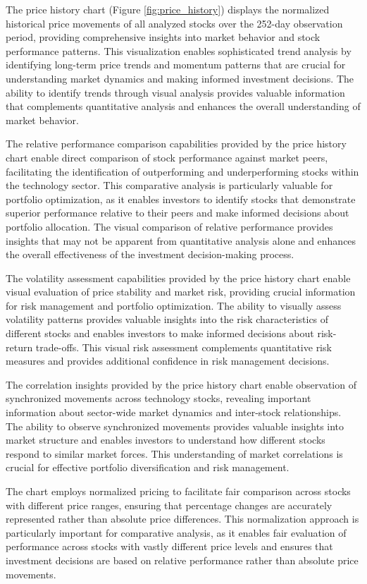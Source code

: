 \documentclass[12pt,a4paper]{article}
\begin{document}
The price history chart (Figure \ref{fig:price_history}) displays the normalized historical price movements of all analyzed stocks over the 252-day observation period, providing comprehensive insights into market behavior and stock performance patterns. This visualization enables sophisticated trend analysis by identifying long-term price trends and momentum patterns that are crucial for understanding market dynamics and making informed investment decisions. The ability to identify trends through visual analysis provides valuable information that complements quantitative analysis and enhances the overall understanding of market behavior.

The relative performance comparison capabilities provided by the price history chart enable direct comparison of stock performance against market peers, facilitating the identification of outperforming and underperforming stocks within the technology sector. This comparative analysis is particularly valuable for portfolio optimization, as it enables investors to identify stocks that demonstrate superior performance relative to their peers and make informed decisions about portfolio allocation. The visual comparison of relative performance provides insights that may not be apparent from quantitative analysis alone and enhances the overall effectiveness of the investment decision-making process.

The volatility assessment capabilities provided by the price history chart enable visual evaluation of price stability and market risk, providing crucial information for risk management and portfolio optimization. The ability to visually assess volatility patterns provides valuable insights into the risk characteristics of different stocks and enables investors to make informed decisions about risk-return trade-offs. This visual risk assessment complements quantitative risk measures and provides additional confidence in risk management decisions.

The correlation insights provided by the price history chart enable observation of synchronized movements across technology stocks, revealing important information about sector-wide market dynamics and inter-stock relationships. The ability to observe synchronized movements provides valuable insights into market structure and enables investors to understand how different stocks respond to similar market forces. This understanding of market correlations is crucial for effective portfolio diversification and risk management.

The chart employs normalized pricing to facilitate fair comparison across stocks with different price ranges, ensuring that percentage changes are accurately represented rather than absolute price differences. This normalization approach is particularly important for comparative analysis, as it enables fair evaluation of performance across stocks with vastly different price levels and ensures that investment decisions are based on relative performance rather than absolute price movements.
\end{document}
